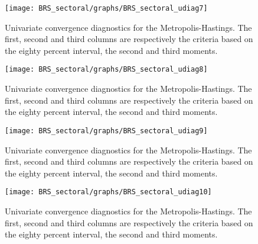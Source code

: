 \begin{figure}[H]
\centering 
\texttt{[image: BRS\_sectoral/graphs/BRS\_sectoral\_udiag7]}
\caption{Univariate convergence diagnostics for the Metropolis-Hastings.
The first, second and third columns are respectively the criteria based on
the eighty percent interval, the second and third moments.}\label{Fig:UnivariateDiagnostics:7}
\end{figure}

\begin{figure}[H]
\centering 
\texttt{[image: BRS\_sectoral/graphs/BRS\_sectoral\_udiag8]}
\caption{Univariate convergence diagnostics for the Metropolis-Hastings.
The first, second and third columns are respectively the criteria based on
the eighty percent interval, the second and third moments.}\label{Fig:UnivariateDiagnostics:8}
\end{figure}

\begin{figure}[H]
\centering 
\texttt{[image: BRS\_sectoral/graphs/BRS\_sectoral\_udiag9]}
\caption{Univariate convergence diagnostics for the Metropolis-Hastings.
The first, second and third columns are respectively the criteria based on
the eighty percent interval, the second and third moments.}\label{Fig:UnivariateDiagnostics:9}
\end{figure}

\begin{figure}[H]
\centering 
\texttt{[image: BRS\_sectoral/graphs/BRS\_sectoral\_udiag10]}
\caption{Univariate convergence diagnostics for the Metropolis-Hastings.
The first, second and third columns are respectively the criteria based on
the eighty percent interval, the second and third moments.}\label{Fig:UnivariateDiagnostics:10}
\end{figure}

